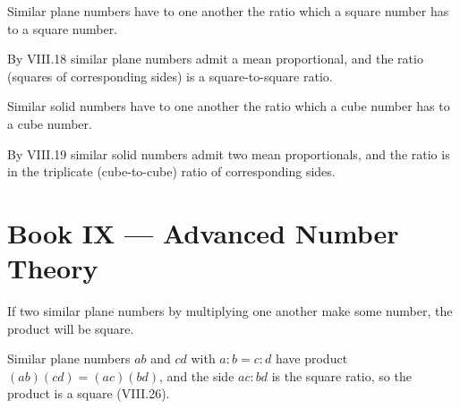 \documentclass{rrxiv}
\begin{document}
\begin{claim}
\label{prop:VIII.26}
Similar plane numbers have to one another the ratio which a square
number has to a square number.
\end{claim}
\begin{evidence}
\label{ev:VIII.26}
By VIII.18 similar plane numbers admit a mean proportional, and the
ratio (squares of corresponding sides) is a square-to-square ratio.
\end{evidence}

\begin{claim}
\label{prop:VIII.27}
Similar solid numbers have to one another the ratio which a cube
number has to a cube number.
\end{claim}
\begin{evidence}
\label{ev:VIII.27}
By VIII.19 similar solid numbers admit two mean proportionals, and
the ratio is in the triplicate (cube-to-cube) ratio of corresponding
sides.
\end{evidence}
%
%

\section{Book IX --- Advanced Number Theory}
\label{sec:book-IX}

\begin{claim}
\label{prop:IX.1}
If two similar plane numbers by multiplying one another make some
number, the product will be square.
\end{claim}
\begin{evidence}[Proof of IX.1]
\label{ev:IX.1}
Similar plane numbers $ab$ and $cd$ with $a:b = c:d$ have product
$(ab)(cd) = (ac)(bd)$, and the side $ac : bd$ is the square ratio,
so the product is a square (VIII.26).
\end{evidence}
\end{document}
